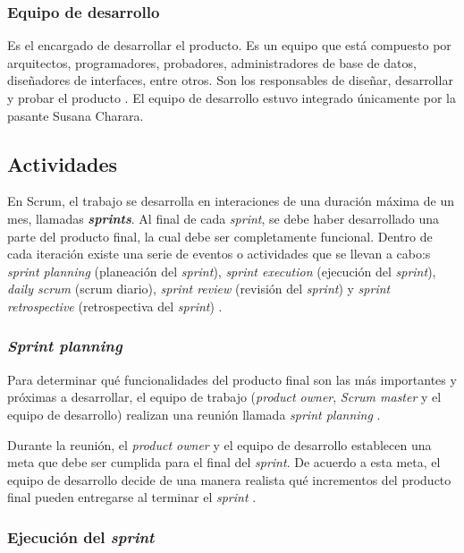 \subsubsection{Equipo de desarrollo}

Es el encargado de desarrollar el producto. Es un equipo que está compuesto por arquitectos, programadores, probadores, administradores de base de datos, diseñadores de interfaces, entre otros. Son los responsables de diseñar, desarrollar y probar el producto \cite{SCRM12}. El equipo de desarrollo estuvo integrado únicamente por la pasante Susana Charara.

\subsection{Actividades}

En Scrum, el trabajo se desarrolla en interaciones de una duración máxima de un mes, llamadas \textit{\textbf{sprints}}. Al final de cada \textit{sprint}, se debe haber desarrollado una parte del producto final, la cual debe ser completamente funcional. Dentro de cada iteración existe una serie de eventos o actividades que se llevan a cabo:s \textit{sprint planning} (planeación del \textit{sprint}), \textit{sprint execution} (ejecución del \textit{sprint}), \textit{daily scrum} (scrum diario), \textit{sprint review} (revisión del \textit{sprint}) y \textit{sprint retrospective} (retrospectiva del \textit{sprint}) \cite{SCRM12}.

\subsubsection{\textit{Sprint planning}}
Para determinar qué funcionalidades del producto final son las más importantes y próximas a desarrollar, el equipo de trabajo (\textit{product owner}, \textit{Scrum master} y el equipo de desarrollo) realizan una reunión llamada \textit{sprint planning} \cite{SCRM12}.

Durante la reunión, el \textit{product owner} y el equipo de desarrollo establecen una meta que debe ser cumplida para el final del \textit{sprint}. De acuerdo a esta meta, el equipo de desarrollo decide de una manera realista qué incrementos del producto final pueden entregarse al terminar el \textit{sprint} \cite{SCRM12}.

\subsubsection{Ejecución del \textit{sprint}}

